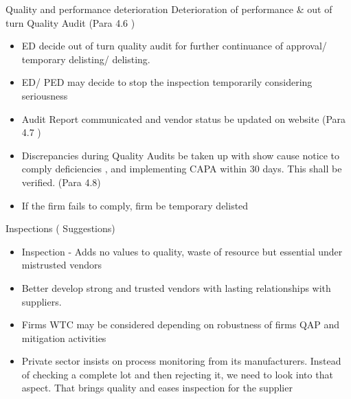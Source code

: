 \documentclass[
  10pt,
  ignorenonframetext,
  aspectratio=43,
]{beamer}
\begin{document}
\begin{frame}{Quality and performance deterioration}
\protect\hypertarget{quality-and-performance-deterioration}{}
Deterioration of performance \& out of turn Quality Audit (Para 4.6 )

\begin{itemize}
\item
  ED decide out of turn quality audit for further continuance of
  approval/ temporary delisting/ delisting.
\item
  ED/ PED may decide to stop the inspection temporarily considering
  seriousness
\item
  Audit Report communicated and vendor status be updated on website
  (Para 4.7 )
\item
  Discrepancies during Quality Audits be taken up with show cause notice
  to comply deficiencies , and implementing CAPA within 30 days. This
  shall be verified. (Para 4.8)
\item
  If the firm fails to comply, firm be temporary delisted
\end{itemize}
\end{frame}

\begin{frame}{Inspections ( Suggestions)}
\protect\hypertarget{inspections-suggestions}{}
\begin{itemize}
\item
  Inspection - Adds no values to quality, waste of resource but
  essential under mistrusted vendors
\item
  Better develop strong and trusted vendors with lasting relationships
  with suppliers.
\item
  Firms WTC may be considered depending on robustness of firms QAP and
  mitigation activities
\item
  Private sector insists on process monitoring from its manufacturers.
  Instead of checking a complete lot and then rejecting it, we need to
  look into that aspect. That brings quality and eases inspection for
  the supplier
\end{itemize}
\end{frame}
\end{document}
